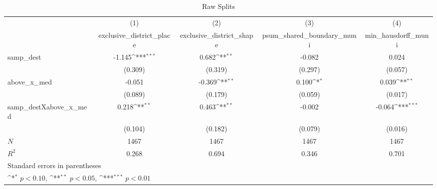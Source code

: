 \begin{table}[htbp]\centering
\def\sym#1{\ifmmode^{#1}\else\(^{#1}\)\fi}
\caption{Raw Splits}
\begin{tabular}{l*{4}{c}}
\hline\hline
            &\multicolumn{1}{c}{(1)}&\multicolumn{1}{c}{(2)}&\multicolumn{1}{c}{(3)}&\multicolumn{1}{c}{(4)}\\
            &\multicolumn{1}{c}{exclusive\_district\_place}&\multicolumn{1}{c}{exclusive\_district\_shape}&\multicolumn{1}{c}{psum\_shared\_boundary\_muni}&\multicolumn{1}{c}{min\_hausdorff\_muni}\\
\hline
samp\_dest   &      -1.145\sym{***}&       0.682\sym{**} &      -0.082         &       0.024         \\
            &     (0.309)         &     (0.319)         &     (0.297)         &     (0.057)         \\
[1em]
above\_x\_med &      -0.051         &      -0.369\sym{**} &       0.100\sym{*}  &       0.039\sym{**} \\
            &     (0.089)         &     (0.179)         &     (0.059)         &     (0.017)         \\
[1em]
samp\_destXabove\_x\_med&       0.218\sym{**} &       0.463\sym{**} &      -0.002         &      -0.064\sym{***}\\
            &     (0.104)         &     (0.182)         &     (0.079)         &     (0.016)         \\
\hline
\(N\)       &        1467         &        1467         &        1467         &        1467         \\
\(R^{2}\)   &       0.268         &       0.694         &       0.346         &       0.701         \\
\hline\hline
\multicolumn{5}{l}{\footnotesize Standard errors in parentheses}\\
\multicolumn{5}{l}{\footnotesize \sym{*} \(p<0.10\), \sym{**} \(p<0.05\), \sym{***} \(p<0.01\)}\\
\end{tabular}
\end{table}
